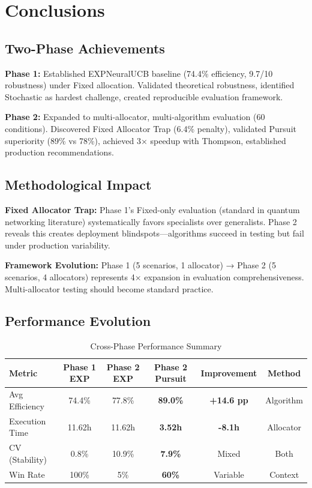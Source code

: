\documentclass[11pt,a4paper]{article}
\newcommand{\success}[1]{\textcolor{successcolor}{\textbf{#1}}}
\begin{document}
\section{Conclusions}

\subsection{Two-Phase Achievements}

\textbf{Phase 1:} Established EXPNeuralUCB baseline (74.4\% efficiency, 9.7/10 robustness) under Fixed allocation. Validated theoretical robustness, identified Stochastic as hardest challenge, created reproducible evaluation framework.

\textbf{Phase 2:} Expanded to multi-allocator, multi-algorithm evaluation (60 conditions). Discovered Fixed Allocator Trap (6.4\% penalty), validated Pursuit superiority (89\% vs 78\%), achieved 3× speedup with Thompson, established production recommendations.

\subsection{Methodological Impact}

\textbf{Fixed Allocator Trap:} Phase 1's Fixed-only evaluation (standard in quantum networking literature) systematically favors specialists over generalists. Phase 2 reveals this creates deployment blindspots—algorithms succeed in testing but fail under production variability.

\textbf{Framework Evolution:} Phase 1 (5 scenarios, 1 allocator) → Phase 2 (5 scenarios, 4 allocators) represents 4× expansion in evaluation comprehensiveness. Multi-allocator testing should become standard practice.

\subsection{Performance Evolution}

\begin{table}[h]
\centering\small
\caption{Cross-Phase Performance Summary}
\begin{tabular}{lccccc}
\toprule
\textbf{Metric} & \textbf{Phase 1 EXP} & \textbf{Phase 2 EXP} & \textbf{Phase 2 Pursuit} & \textbf{Improvement} & \textbf{Method} \\
\midrule
Avg Efficiency & 74.4\% & 77.8\% & \success{89.0\%} & \success{+14.6 pp} & Algorithm \\
Execution Time & 11.62h & 11.62h & \success{3.52h} & \success{-8.1h} & Allocator \\
CV (Stability) & 0.8\% & 10.9\% & \success{7.9\%} & Mixed & Both \\
Win Rate & 100\% & 5\% & \success{60\%} & Variable & Context \\
\bottomrule
\end{tabular}
\end{table}
\end{document}
